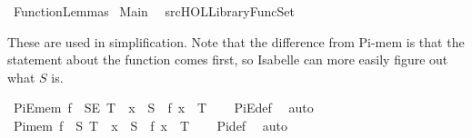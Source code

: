 %
\begin{isabellebody}%
\def\isabellecontext{FunctionLemmas}%
%
\isamarkuptrue%
%
\isadelimtheory
%
\endisadelimtheory
%
\isatagtheory
{}\isamarkupfalse%
\ FunctionLemmas\isanewline
\isanewline
{}\ Main\isanewline
\ \ {\isachardoublequoteopen}{\isachartilde}{\isachartilde}{\isacharslash}src{\isacharslash}HOL{\isacharslash}Library{\isacharslash}FuncSet{\isachardoublequoteclose}\isanewline
{}%
\endisatagtheory
{\isafoldtheory}%
%
\isadelimtheory
%
\endisadelimtheory
%
\begin{isamarkuptext}%
These are used in simplification. Note that the difference from Pi-mem is that the statement
about the function comes first, so Isabelle can more easily figure out what $S$ is.%
\end{isamarkuptext}%
\isamarkuptrue%
\isamarkupfalse%
\ PiE{\isacharunderscore}mem{}{\isacharcolon}\ {\isachardoublequoteopen}f\ {\isasymin}\ S{\isasymrightarrow}\isactrlsub E\ T\ {\isasymLongrightarrow}\ x\ {\isasymin}\ S\ {\isasymLongrightarrow}\ f\ x\ {\isasymin}\ T{\isachardoublequoteclose}\isanewline
%
\isadelimproof
\ \ %
\endisadelimproof
%
\isatagproof
{}\isamarkupfalse%
\ PiE{\isacharunderscore}def\ \isamarkupfalse%
\ auto%
\endisatagproof
{\isafoldproof}%
%
\isadelimproof
\isanewline
%
\endisadelimproof
{}\isamarkupfalse%
\ Pi{\isacharunderscore}mem{}{\isacharcolon}\ {\isachardoublequoteopen}f\ {\isasymin}\ S{\isasymrightarrow}\ T\ {\isasymLongrightarrow}\ x\ {\isasymin}\ S\ {\isasymLongrightarrow}\ f\ x\ {\isasymin}\ T{\isachardoublequoteclose}\isanewline
%
\isadelimproof
\ \ %
\endisadelimproof
%
\isatagproof
{}\isamarkupfalse%
\ Pi{\isacharunderscore}def\ \isamarkupfalse%
\ auto%
\endisatagproof
{\isafoldproof}%
%
\isadelimproof
\isanewline
%
\endisadelimproof
%
\isadelimtheory
\isanewline
%
\endisadelimtheory
%
\isatagtheory
{}\isamarkupfalse%
%
\endisatagtheory
{\isafoldtheory}%
%
\isadelimtheory
%
\endisadelimtheory
\end{isabellebody}%
